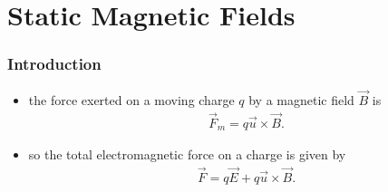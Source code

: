 \documentclass[10pt]{article}
\begin{document}
\part{Static Magnetic Fields}

\section{Introduction}
\begin{itemize}
    \item the force exerted on a moving charge $q$ by a magnetic field $\vec{B} $ is 
        \begin{gather*}
            \vec{F}_m = q\vec{u} \times \vec{B}
        .\end{gather*}
    \item so the total electromagnetic force on a charge is given by 
        \begin{gather*}
            \vec{F} = q\vec{E} + q\vec{u} \times \vec{B} 
        .\end{gather*}
\end{itemize}
\end{document}
